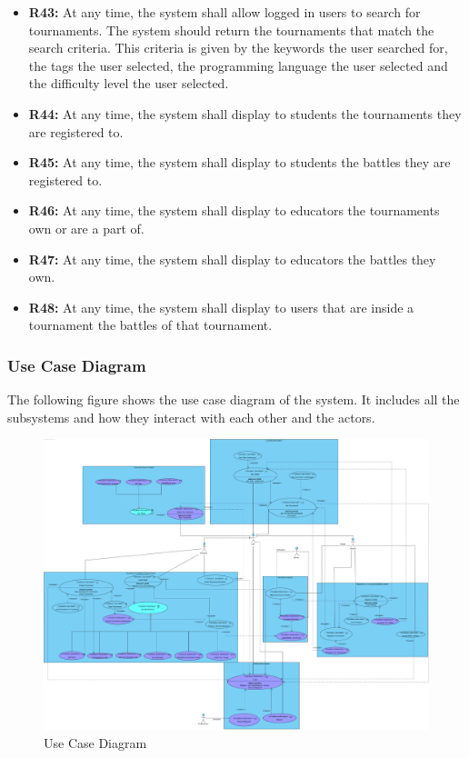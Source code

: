 \documentclass{article}
\begin{document}
\begin{itemize}
    \item \textbf{R43:} At any time, the system shall allow logged in users to search for tournaments. The system should return the tournaments that match the search criteria. This criteria is given by the keywords the user searched for, the tags the user selected, the programming language the user selected and the difficulty level the user selected.
    \item \textbf{R44:} At any time, the system shall display to students the tournaments they are registered to.
    \item \textbf{R45:} At any time, the system shall display to students the battles they are registered to.
    \item \textbf{R46:} At any time, the system shall display to educators the tournaments own or are a part of.
    \item \textbf{R47:} At any time, the system shall display to educators the battles they own.
    \item \textbf{R48:} At any time, the system shall display to users that are inside a tournament the battles of that tournament.


\end{itemize}
\newpage
\subsubsection{Use Case Diagram}

The following figure shows the use case diagram of the system. It includes all the subsystems and how they interact with each other and
the actors.

\begin{figure}[!h]
    \centering
    \includegraphics[width=1\textwidth]{images/UseCaseDiagram}
    \caption{Use Case Diagram}
    \label{fig:UseCaseDiagram}
\end{figure}
\end{document}

